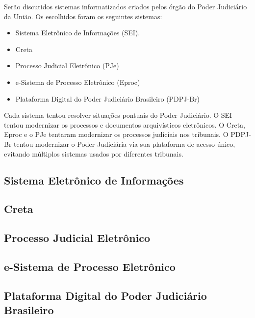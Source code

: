 
Serão discutidos sistemas informatizados criados pelos órgão do Poder Judiciário da União. Os escolhidos foram os seguintes sistemas:

\begin{itemize}
	\item Sistema Eletrônico de Informações (SEI).
	\item Creta
	\item Processo Judicial Eletrônico (PJe)
	\item e-Sistema de Processo Eletrônico (Eproc)
	\item Plataforma Digital do Poder Judiciário Brasileiro (PDPJ-Br)
\end{itemize}

Cada sistema tentou resolver situações pontuais do Poder Judiciário. O SEI tentou modernizar os processos e documentos arquivísticos eletrônicos. O Creta, Eproc e o PJe tentaram modernizar os processos judiciais nos tribunais. O PDPJ-Br tentou modernizar o Poder Judiciária via sua plataforma de acesso único, evitando múltiplos sistemas usados por diferentes tribunais. 

\subsection{Sistema Eletrônico de Informações}

\subsection{Creta}

\subsection{Processo Judicial Eletrônico}

\subsection{e-Sistema de Processo Eletrônico}

\subsection{Plataforma Digital do Poder Judiciário Brasileiro}
